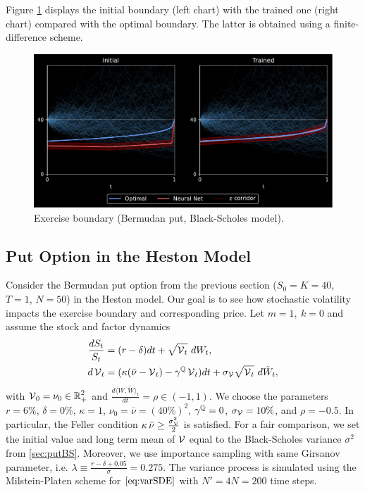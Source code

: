 Figure \ref{fig:putBS} displays the initial boundary (left chart) with the trained one (right chart) compared with the optimal boundary. The latter is obtained using a finite-difference scheme.  

\begin{figure}
    \centering
    \caption{Exercise boundary (Bermudan put,  Black-Scholes model).}
    \includegraphics[scale=0.5]{Figures/Bdry 2, lbda=0.275, mu=0.050, N=50.pdf}
    
    \label{fig:putBS}
\end{figure}

\subsection{Put Option in the Heston Model}\label{sec:putHeston}

Consider the Bermudan put option from the previous section ($S_0 =K=40$, $T=1$, $N=50$) in the Heston model. Our goal is to see how stochastic volatility impacts the exercise boundary and  corresponding  price.   
 Let $m=1, \ k=0$ and assume the stock and factor dynamics
\begin{align}
   \frac{dS_t}{S_t} &= (r-\delta)dt + \sqrt{\operatorname{\mathcal{V}}_t}\  dW_t, \\
   d\operatorname{\mathcal{V}}_t &= (\kappa(\bar{\nu}-\operatorname{\mathcal{V}}_t) - \gamma^{\operatorname{\mathbb{Q}}}\operatorname{\mathcal{V}}_t)dt + \sigma_{\operatorname{\mathcal{V}}} \sqrt{\operatorname{\mathcal{V}}_t}\  d\tilde{W}_t, \label{eq:varSDE}
\end{align}
with $\operatorname{\mathcal{V}}_0 = \nu_0 \in \operatorname{\mathbb{R}}^2_+$ and $\frac{d\langle W, \tilde{W} \rangle_t}{dt} = \rho  \in  (-1,1)$. 
We choose the parameters
 $r = 6\%$, $\delta = 0\%$, $\kappa = 1$, $\nu_0 = \bar{\nu} = (40\%)^2$, $\gamma^{\operatorname{\mathbb{Q}}} =0$, $\sigma_{\operatorname{\mathcal{V}}} =10\%$, and $\rho =-0.5$. In particular, 
the Feller condition $\kappa \,  \bar{\nu} \ge  \frac{\sigma_{\operatorname{\mathcal{V}}}^2}{2}$ is satisfied.  
For a fair comparison,  we set the initial value and long term mean of $\operatorname{\mathcal{V}}$ equal to the Black-Scholes variance $\sigma^2$ from \cref{sec:putBS}.   Moreover, we use importance sampling with same Girsanov parameter, i.e. $\lambda \equiv \frac{r-\delta + 0.05}{\sigma}  = 0.275$. The  variance process is simulated using the Milstein-Platen scheme \cite{KP} for $\eqref{eq:varSDE}$ with $N' =4N=200$ time steps.  %

